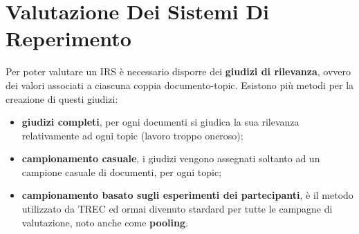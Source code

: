 \documentclass{article}
\begin{document}
\section{Valutazione Dei Sistemi Di Reperimento}
Per poter valutare un IRS è necessario disporre dei \textbf{giudizi di rilevanza}, ovvero dei valori associati a ciascuna coppia documento-topic. Esistono più metodi per la creazione di questi giudizi:
\begin{itemize}
\item \textbf{giudizi completi}, per ogni documenti si giudica la sua rilevanza relativamente ad ogni topic (lavoro troppo oneroso);
\item \textbf{campionamento casuale}, i giudizi vengono assegnati soltanto ad un campione casuale di documenti, per ogni topic;
\item \textbf{campionamento basato sugli esperimenti dei partecipanti}, è il metodo utilizzato da TREC ed ormai divenuto stardard per tutte le campagne di valutazione, noto anche come \textbf{pooling}.
\end{itemize}
\end{document}
